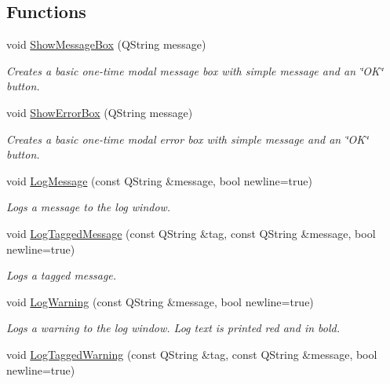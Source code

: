 \subsection*{Functions}
\begin{DoxyCompactItemize}
\item 
void \hyperlink{group___global_variables_ga9551f73a6927861d0b6f5d7901c90888}{Show\-Message\-Box} (Q\-String message)
\begin{DoxyCompactList}\small\item\em Creates a basic one-\/time modal message box with simple message and an \char`\"{}\-O\-K\char`\"{} button. \end{DoxyCompactList}\item 
void \hyperlink{group___global_variables_gadf8a13f3d23660f424828d7f559addd3}{Show\-Error\-Box} (Q\-String message)
\begin{DoxyCompactList}\small\item\em Creates a basic one-\/time modal error box with simple message and an \char`\"{}\-O\-K\char`\"{} button. \end{DoxyCompactList}\item 
void \hyperlink{group___global_variables_ga1788dc69b89b298a038015cbb83f8183}{Log\-Message} (const Q\-String \&message, bool newline=true)
\begin{DoxyCompactList}\small\item\em Logs a message to the log window. \end{DoxyCompactList}\item 
void \hyperlink{group___global_variables_gacb9fa8876388ad9319c61d9ae4d21510}{Log\-Tagged\-Message} (const Q\-String \&tag, const Q\-String \&message, bool newline=true)
\begin{DoxyCompactList}\small\item\em Logs a tagged message. \end{DoxyCompactList}\item 
void \hyperlink{group___global_variables_ga4b2863ab23932e06f2b5f292c66e7ef6}{Log\-Warning} (const Q\-String \&message, bool newline=true)
\begin{DoxyCompactList}\small\item\em Logs a warning to the log window. Log text is printed red and in bold. \end{DoxyCompactList}\item 
void \hyperlink{group___global_variables_ga49e471be032d9340fe6b4c251d1aef21}{Log\-Tagged\-Warning} (const Q\-String \&tag, const Q\-String \&message, bool newline=true)

\end{DoxyCompactItemize}
